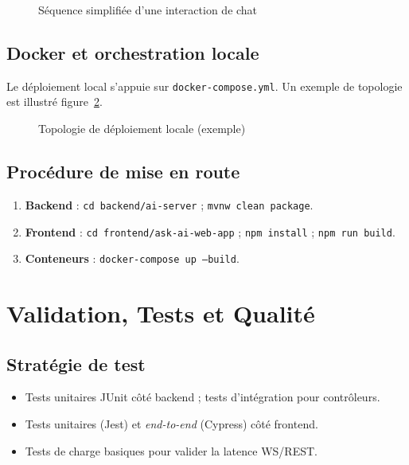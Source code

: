 \documentclass[12pt,a4paper]{report}
\begin{document}
\begin{figure}[H]
  \centering
  
  \caption{Séquence simplifiée d'une interaction de chat}
  \label{fig:seq-chat}
\end{figure}

\section{Docker et orchestration locale}
Le déploiement local s'appuie sur \texttt{docker-compose.yml}. Un exemple de topologie est illustré figure~\ref{fig:deploiement-dc}.

\begin{figure}[H]
  \centering
  
  \caption{Topologie de déploiement locale (exemple)}
  \label{fig:deploiement-dc}
\end{figure}

\section{Procédure de mise en route}
\begin{enumerate}[leftmargin=*,nosep]
  \item \textbf{Backend} : \texttt{cd backend/ai-server} ; \texttt{mvnw clean package}.
  \item \textbf{Frontend} : \texttt{cd frontend/ask-ai-web-app} ; \texttt{npm install} ; \texttt{npm run build}.
  \item \textbf{Conteneurs} : \texttt{docker-compose up --build}.
\end{enumerate}

\chapter{Validation, Tests et Qualité}
\section{Stratégie de test}
\begin{itemize}[leftmargin=*,nosep]
  \item Tests unitaires JUnit côté backend ; tests d'intégration pour contrôleurs.
  \item Tests unitaires (Jest) et \emph{end-to-end} (Cypress) côté frontend.
  \item Tests de charge basiques pour valider la latence \ac{WS}/REST.
\end{itemize}
\end{document}
